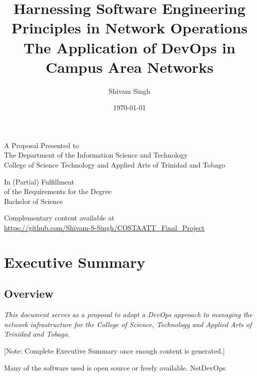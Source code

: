 \documentclass[12pt, letterpaper]{article}
\begin{document}
\title{Harnessing Software Engineering Principles in Network Operations \\
\vspace{0.5cm}
\large The Application of DevOps in Campus Area Networks}
\author{Shivam Singh}
\date{\today}
\maketitle

\vspace{1cm}

\begin{center}

A Proposal Presented to\\ 
The Department of the Information Science and Technology\\
College of Science Technology and Applied Arts of Trinidad and Tobago 

\vspace{1cm}

In (Partial) Fulfillment\\
of the Requirements for the Degree\\
Bachelor of Science

\vspace{1cm}

Complementary content available at \\
\url{https://github.com/Shivam-S-Singh/COSTAATT_Final_Project}


\end{center}

\newpage

\tableofcontents

\newpage

\section{Executive Summary}
	\subsection{Overview}
\begin{center}
\textit{This document serves as a proposal to adopt a DevOps approach to managing the network infrastructure for the College of Science, Technology and Applied Arts of Trinidad and Tobago.}
\end{center}


[Note: Complete Executive Summary once enough content is generated.]

Many of the software used is open source or freely available. NetDevOps
\end{document}
